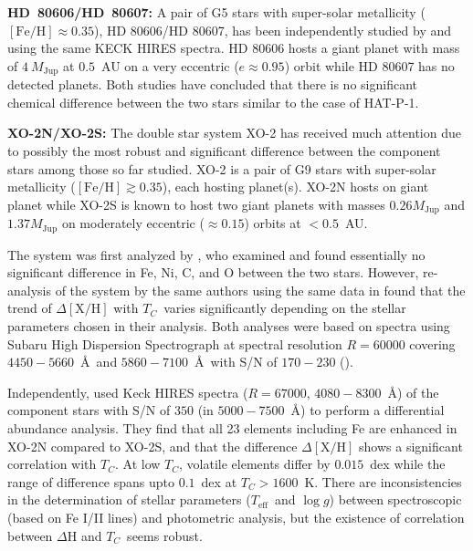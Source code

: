 \documentclass[modern, letterpaper]{aastex61}
\newcommand*\elem[1]{\ensuremath{\mathrm{#1}}}
\newcommand*\elemH[1]{\ensuremath{[\mathrm{#1}/\elem{H}]}}
\newcommand*\teff{\ensuremath{T_\mathrm{eff}}}
\newcommand*\logg{\ensuremath{\log{g}}}
\newcommand*{\feh}{\ensuremath{\elemH{Fe}}}
\newcommand{\Tcondens}{\ensuremath{T_C}}
\newcommand{\mjupiter}{\ensuremath{M_\mathrm{Jup}}}
\begin{document}
{\bf HD~80606/HD~80607:}
A pair of G5 stars with super-solar metallicity ($\feh \approx 0.35$),
HD 80606/HD 80607, has been independently studied by
\citealt{Saffe:2015aa} and \citealt{Mack:2016aa} using the same KECK HIRES
spectra. HD 80606 hosts a giant planet with mass of $4~\mjupiter$ at $0.5$~AU
on a very eccentric ($e\approx0.95$) orbit while HD 80607 has no detected
planets.
Both studies have concluded that there is no significant
chemical difference between the two stars similar to the case of HAT-P-1.

{\bf XO-2N/XO-2S:}
The double star system XO-2 has received much attention due to
possibly the most robust and significant difference between the component stars
among those so far studied.
XO-2 is a pair of G9 stars with super-solar metallicity ($\feh \gtrsim 0.35$),
each hosting planet(s).
XO-2N hosts on giant planet while XO-2S is known to host two giant planets with
masses $0.26 \mjupiter$ and $1.37 \mjupiter$ on moderately eccentric ($\approx
0.15$) orbits at $<0.5$~AU.

The system was first analyzed by \citealt{Teske:2013aa}, who examined and found
essentially no significant difference in Fe, Ni, C, and O between the two
stars.
However, re-analysis of the system by the same authors using the same data in
\citealt{Teske:2015aa} found that the trend of $\Delta\elemH{X}$ with
\Tcondens\ varies significantly depending on the stellar parameters chosen in
their analysis. Both analyses were based on spectra
using Subaru High Dispersion Spectrograph at spectral resolution $R=60000$
covering $4450-5660$~\AA\ and $5860-7100$~\AA\ with S/N of $170-230$
(\citealt{Teske:2013aa}).

Independently, \citealt{Ramirez:2015aa} used Keck HIRES spectra ($R=67000$,
$4080-8300$~\AA) of the component stars with S/N of $350$ (in $5000-7500$~\AA)
to perform a differential abundance analysis.
They find that all 23 elements including Fe are enhanced in XO-2N
compared to XO-2S, and that the difference $\Delta\elemH{X}$ shows
a significant correlation with \Tcondens.
At low \Tcondens, volatile elements differ by $0.015$~dex
while the range of difference spans upto $0.1$~dex at $\Tcondens>1600$~K.
There are inconsistencies in the determination of stellar parameters
(\teff\ and \logg) between spectroscopic (based on Fe I/II lines)
and photometric analysis,
but the existence of correlation between $\Delta\elem{H}$ and
\Tcondens\ seems robust.
\end{document}
